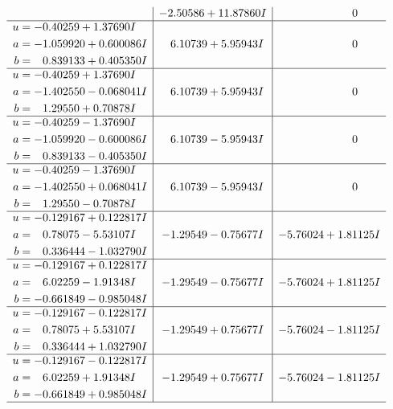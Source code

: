 \documentclass[1p]{elsarticle_modified}
\theoremstyle{definition}
\begin{document}
$$\begin{array}{c|c|c}
 & -2.50586 + 11.87860 I & \phantom{-0.000000 } 0 \\ \hline\begin{aligned}
u &= -0.40259 + 1.37690 I \\
a &= -1.059920 + 0.600086 I \\
b &= \phantom{-}0.839133 + 0.405350 I\end{aligned}
 & \phantom{-}6.10739 + 5.95943 I & \phantom{-0.000000 } 0 \\ \hline\begin{aligned}
u &= -0.40259 + 1.37690 I \\
a &= -1.402550 - 0.068041 I \\
b &= \phantom{-}1.29550 + 0.70878 I\end{aligned}
 & \phantom{-}6.10739 + 5.95943 I & \phantom{-0.000000 } 0 \\ \hline\begin{aligned}
u &= -0.40259 - 1.37690 I \\
a &= -1.059920 - 0.600086 I \\
b &= \phantom{-}0.839133 - 0.405350 I\end{aligned}
 & \phantom{-}6.10739 - 5.95943 I & \phantom{-0.000000 } 0 \\ \hline\begin{aligned}
u &= -0.40259 - 1.37690 I \\
a &= -1.402550 + 0.068041 I \\
b &= \phantom{-}1.29550 - 0.70878 I\end{aligned}
 & \phantom{-}6.10739 - 5.95943 I & \phantom{-0.000000 } 0 \\ \hline\begin{aligned}
u &= -0.129167 + 0.122817 I \\
a &= \phantom{-}0.78075 - 5.53107 I \\
b &= \phantom{-}0.336444 - 1.032790 I\end{aligned}
 & -1.29549 - 0.75677 I & -5.76024 + 1.81125 I \\ \hline\begin{aligned}
u &= -0.129167 + 0.122817 I \\
a &= \phantom{-}6.02259 - 1.91348 I \\
b &= -0.661849 - 0.985048 I\end{aligned}
 & -1.29549 - 0.75677 I & -5.76024 + 1.81125 I \\ \hline\begin{aligned}
u &= -0.129167 - 0.122817 I \\
a &= \phantom{-}0.78075 + 5.53107 I \\
b &= \phantom{-}0.336444 + 1.032790 I\end{aligned}
 & -1.29549 + 0.75677 I & -5.76024 - 1.81125 I \\ \hline\begin{aligned}
u &= -0.129167 - 0.122817 I \\
a &= \phantom{-}6.02259 + 1.91348 I \\
b &= -0.661849 + 0.985048 I\end{aligned}
 & -1.29549 + 0.75677 I & -5.76024 - 1.81125 I\\
 \hline 
 \end{array}$$\newpage\newpage\renewcommand{\arraystretch}{1}
\end{document}
